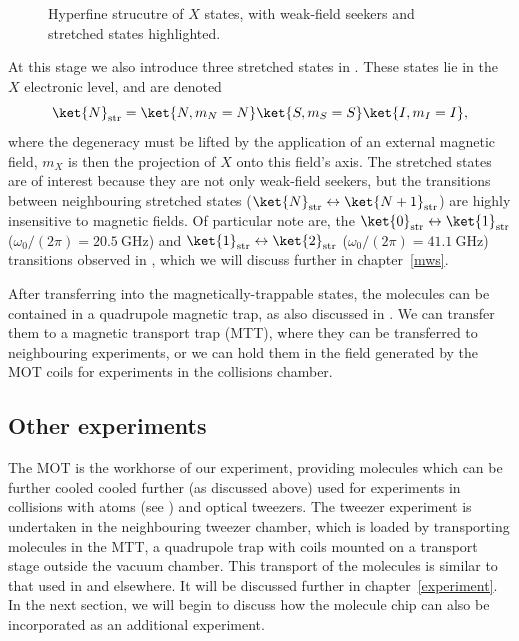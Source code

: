 \begin{figure}
  \caption{Hyperfine strucutre of \CaF{} $X$ states, with weak-field seekers
    and stretched states highlighted.}
  \label{overview:fig:magrapstates}
\end{figure}


At this stage we also introduce three stretched states in \CaF{}. These states
lie in the $X$ electronic level, and are denoted
%
\begin{equation}
  \ket{N}_\text{str} = \ket{N, m_N=N}\ket{S, m_S=S}\ket{I,m_I=I},
\end{equation}
%
where the degeneracy must be lifted by the application of an external magnetic
field, $m_X$ is then the projection of $X$ onto this field's axis. The
stretched states are of interest because they are not only weak-field seekers,
but the transitions between neighbouring stretched states
($\ket{N}_\text{str}\leftrightarrow\ket{N+1}_\text{str}$) are highly
insensitive to magnetic fields. Of particular note are, the
$\ket{0}_\text{str}\leftrightarrow\ket{1}_\text{str}$ ($\omega_0/(2\pi) =
\SI{20.5}{\giga\hertz}$) and
$\ket{1}_\text{str}\leftrightarrow\ket{2}_\text{str}$ ($\omega_0/(2\pi) =
\SI{41.1}{\giga\hertz}$) transitions observed in
, which we will discuss further in
chapter~\ref{mws}.

After transferring into the magnetically-trappable states, the molecules can be
contained in a quadrupole magnetic trap, as also discussed in
. We can transfer them to a magnetic transport
trap (MTT), where they can be transferred to neighbouring experiments, or we
can hold them in the field generated by the MOT coils for experiments in the
collisions chamber.

\subsection{Other experiments}

The \CaF{} MOT is the workhorse of our experiment, providing molecules which
can be further cooled cooled further (as discussed above) used for experiments
in collisions with \Rb{} atoms (see ) and optical tweezers. The tweezer experiment is
undertaken in the neighbouring tweezer chamber, which is loaded by transporting
molecules in the MTT, a quadrupole trap with coils mounted on a transport stage
outside the vacuum chamber. This transport of the molecules is similar to that
used in  and elsewhere. It
will be discussed further in chapter~\ref{experiment}. In the next section, we
will begin to discuss how the molecule chip can also be incorporated as an
additional experiment.


